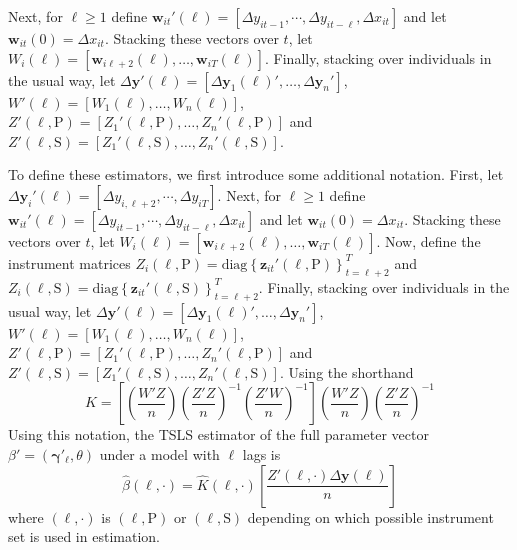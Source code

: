 Next, for $\ell \geq 1$ define $\mathbf{w}_{it}'(\ell) = [\Delta y_{it-1}, \cdots, \Delta y_{it-\ell}, \Delta x_{it}]$ and let $\mathbf{w}_{it}(0) = \Delta x_{it}$.
Stacking these vectors over $t$, let $W_i(\ell) = [\mathbf{w}_{i\ell+2}(\ell), \hdots, \mathbf{w}_{iT}(\ell)]$.
Finally, stacking over individuals in the usual way, let $\Delta \mathbf{y}'(\ell) = [\Delta \mathbf{y}_1(\ell)', \hdots, \Delta \mathbf{y}_n']$,  $W'(\ell) = [W_1(\ell),\hdots, W_n(\ell)]$, $Z'(\ell,\mbox{P}) = \left[ Z_1'(\ell, \mbox{P}), \hdots, Z_n'(\ell,\mbox{P})\right]$ and $Z'(\ell,\mbox{S}) = \left[ Z_1'(\ell, \mbox{S}), \hdots, Z_n'(\ell,\mbox{S})\right]$.

To define these estimators, we first introduce some additional notation.
First, let $\Delta \mathbf{y}_{i}'(\ell) = [\Delta y_{i,\ell+2}, \cdots, \Delta y_{iT}]$.
Next, for $\ell \geq 1$ define $\mathbf{w}_{it}'(\ell) = [\Delta y_{it-1}, \cdots, \Delta y_{it-\ell}, \Delta x_{it}]$ and let $\mathbf{w}_{it}(0) = \Delta x_{it}$.
Stacking these vectors over $t$, let $W_i(\ell) = [\mathbf{w}_{i\ell+2}(\ell), \hdots, \mathbf{w}_{iT}(\ell)]$.
Now, define the instrument matrices $Z_i(\ell,\mbox{P}) = \mbox{diag}\left\{ \mathbf{z}_{it}'(\ell,\mbox{P}) \right\}_{t=\ell+2}^T$ and $Z_i(\ell,\mbox{S}) = \mbox{diag}\left\{ \mathbf{z}_{it}'(\ell,\mbox{S}) \right\}_{t=\ell+2}^T$.
Finally, stacking over individuals in the usual way, let $\Delta \mathbf{y}'(\ell) = [\Delta \mathbf{y}_1(\ell)', \hdots, \Delta \mathbf{y}_n']$,  $W'(\ell) = [W_1(\ell),\hdots, W_n(\ell)]$, $Z'(\ell,\mbox{P}) = \left[ Z_1'(\ell, \mbox{P}), \hdots, Z_n'(\ell,\mbox{P})\right]$ and $Z'(\ell,\mbox{S}) = \left[ Z_1'(\ell, \mbox{S}), \hdots, Z_n'(\ell,\mbox{S})\right]$.
Using the shorthand
\begin{equation}
  \widehat{K}= \left[ \left( \frac{W'Z}{n} \right)\left( \frac{Z'Z}{n} \right)^{-1}\left( \frac{Z'W}{n} \right)^{-1} \right]\left( \frac{W'Z}{n} \right)\left( \frac{Z'Z}{n} \right)^{-1}
\end{equation}
Using this notation, the TSLS estimator of the full parameter vector $\beta' = (\boldsymbol{\gamma}'_\ell, \theta)$ under a model with $\ell$ lags is
\begin{equation}
  \widehat{\beta}\left( \ell,\cdot \right) = \widehat{K}(\ell, \cdot) \left[ \frac{Z'(\ell,\cdot)\Delta \mathbf{y}(\ell)}{n} \right]
\end{equation}
where $(\ell, \cdot)$ is $(\ell, \mbox{P})$ or $(\ell, \mbox{S})$ depending on which possible instrument set is used in estimation.

